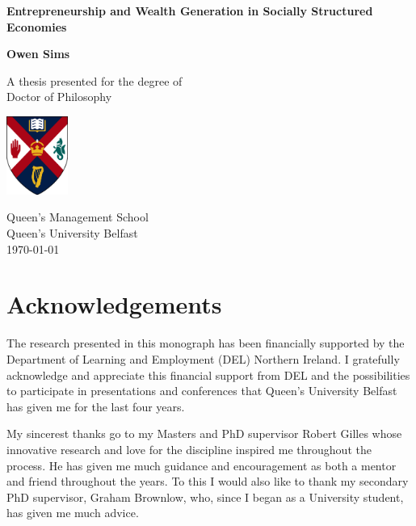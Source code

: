 \documentclass[11pt,fleqn]{book}
\begin{document}
\begin{titlepage}
    \begin{center}
        \vspace*{1cm}
        
        \huge
        \textbf{Entrepreneurship and Wealth Generation in Socially Structured Economies}
        
        \vspace{1.5cm}
        
        \Large
        \textbf{Owen Sims}
        
        \vfill
        
        \large
        A thesis presented for the degree of\\
        Doctor of Philosophy
        
        \vspace{0.8cm}
        
        \includegraphics[width=0.15\textwidth]{imgs/qublogo2.png}
        
        \large
        Queen's Management School\\
        Queen's University Belfast\\
        \today
        
    \end{center}
\end{titlepage}


\thispagestyle{empty}

\newpage

\chapter*{Acknowledgements}

The research presented in this monograph has been financially supported by the Department of Learning and Employment (DEL) Northern Ireland. I gratefully acknowledge and appreciate this financial support from DEL and the possibilities to participate in presentations and conferences that Queen's University Belfast has given me for the last four years.

My sincerest thanks go to my Masters and PhD supervisor Robert Gilles whose innovative research and love for the discipline inspired me throughout the process. He has given me much guidance and encouragement as both a mentor and friend throughout the years. To this I would also like to thank my secondary PhD supervisor, Graham Brownlow, who, since I began as a University student, has given me much advice.
\end{document}
